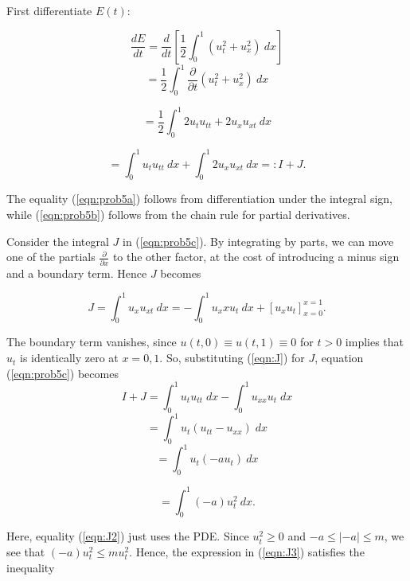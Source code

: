 \documentclass[
]{article}
\begin{document}
First differentiate \(E(t)\):

\[ \frac{dE}{dt}= \frac{d}{dt} \left[\frac{1}{2} \int_{0}^{1}{ \left(u_t^2+u_x^2\right)}\:dx \right]\]
\begin{equation} \label{eqn:prob5a}
=\frac{1}{2} \int_{0}^{1}{ \frac{\partial}{\partial t} \left(u_t^2+u_x^2\right)} \:dx
\end{equation}

\begin{equation} \label{eqn:prob5b}
=\frac{1}{2} \int_{0}^{1}{ 2u_t u_{tt}+ 2u_x u_{xt}}\:dx
\end{equation}

\begin{equation}\label{eqn:prob5c}
=\int_{0}^{1}{ u_t u_{tt}}\: dx + \int_{0}^{1}{2u_x u_{xt}}\:dx =: I+J.
\end{equation}

The equality (\ref{eqn:prob5a}) follows from differentiation under the
integral sign, while (\ref{eqn:prob5b}) follows from the chain rule for
partial derivatives.

Consider the integral \(J\) in (\ref{eqn:prob5c}). By integrating by
parts, we can move one of the partials \(\frac{\partial}{\partial x}\)
to the other factor, at the cost of introducing a minus sign and a
boundary term. Hence \(J\) becomes

\begin{equation} \label{eqn:J}
J=\int_{0}^{1}{ u_x u_{xt}}\: dx =- \int_{0}^{1}{u_xx u_t}\:dx + 
\left[ u_x u_t \right]_{x=0}^{x=1}.
\end{equation}

The boundary term vanishes, since \(u(t,0) \equiv u(t,1) \equiv 0\) for
\(t>0\) implies that \(u_t\) is identically zero at \(x=0,1\). So,
substituting (\ref{eqn:J}) for \(J\), equation (\ref{eqn:prob5c})
becomes
\[ I+J=\int_{0}^{1}{u_t u_{tt}} \;dx - \int_{0}^{1}{u_{xx} u_t} \;dx\]
\[= \int_{0}^{1} {u_t (u_{tt}-u_{xx})} \;dx\]
\begin{equation} \label{eqn:J2}
=\int_{0}^{1}{ u_t(-au_t) }\:dx
\end{equation}

\begin{equation} \label{eqn:J3}
=\int_{0}^{1}{ (-a)u_t^2 }\: dx.
\end{equation}

Here, equality (\ref{eqn:J2}) just uses the PDE. Since \(u_t^2 \geq 0\)
and \(-a \leq \lvert -a \rvert \leq m\), we see that
\((-a)u_t^2 \leq mu_t^2\). Hence, the expression in (\ref{eqn:J3})
satisfies the inequality
\end{document}
